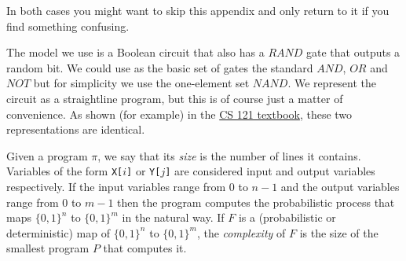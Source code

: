 In both cases you might want to skip this appendix and only return to it
if you find something confusing.

The model we use is a Boolean circuit that also has a
\(\ensuremath{\mathit{RAND}}\) gate that outputs a random bit. We could
use as the basic set of gates the standard
\(\ensuremath{\mathit{AND}}\), \(\ensuremath{\mathit{OR}}\) and
\(\ensuremath{\mathit{NOT}}\) but for simplicity we use the one-element
set \(\ensuremath{\mathit{NAND}}\). We represent the circuit as a
straightline program, but this is of course just a matter of
convenience. As shown (for example) in the \href{http://introtcs.org}{CS
121 textbook}, these two representations are identical.

\hypertarget{randprogdef}{}

Given a program \(\pi\), we say that its \emph{size} is the number of
lines it contains. Variables of the form \texttt{X[}\(i\)\texttt{]} or
\texttt{Y[}\(j\)\texttt{]} are considered input and output variables
respectively. If the input variables range from \(0\) to \(n-1\) and the
output variables range from \(0\) to \(m-1\) then the program computes
the probabilistic process that maps \(\{0,1\}^n\) to \(\{0,1\}^m\) in
the natural way. If \(F\) is a (probabilistic or deterministic) map of
\(\{0,1\}^n\) to \(\{0,1\}^m\), the \emph{complexity} of \(F\) is the
size of the smallest program \(P\) that computes it.

